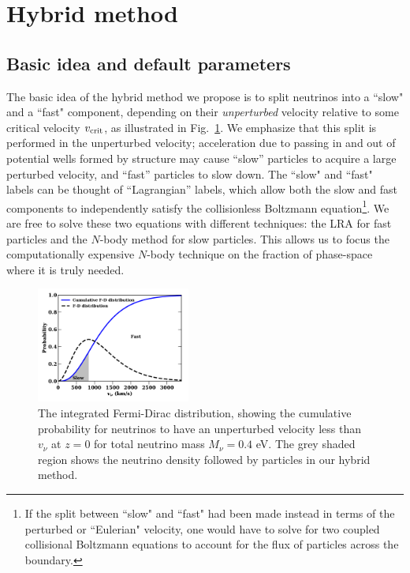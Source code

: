 \documentclass[useAMS, usenatbib]{mnras}
\begin{document}
\section{Hybrid method} \label{sec:hybrid}

\subsection{Basic idea and default parameters}

The basic idea of the hybrid method we propose is to split neutrinos into a ``slow" and a ``fast" component, depending on their \emph{unperturbed} velocity relative to some critical velocity $v_{\rm crit}$, as illustrated in Fig.~\ref{fig:fddistribution}. We emphasize that this split is performed in the unperturbed velocity; acceleration due to passing in and out of potential wells formed by structure may cause ``slow'' particles to acquire a large perturbed velocity, and ``fast'' particles to slow down. The ``slow" and ``fast" labels can be thought of ``Lagrangian'' labels, which allow both the slow and fast components to independently satisfy the collisionless Boltzmann equation\footnote{If the split between ``slow" and ``fast" had been made instead in terms of the perturbed or ``Eulerian" velocity, one would have to solve for two coupled collisional Boltzmann equations to account for the flux of particles across the boundary.}. We are free to solve these two equations with different techniques: the LRA for fast particles and the $N$-body method for slow particles. This allows us to focus the computationally expensive $N$-body technique on the fraction of phase-space where it is truly needed.

\begin{figure}
\includegraphics[width=0.45\textwidth]{nuplots/fermidirac.pdf}
  \caption{The integrated Fermi-Dirac distribution, showing the cumulative probability for neutrinos to have an unperturbed velocity less than $v_\nu$ at $z=0$ for total neutrino mass $M_\nu = 0.4$ eV.
  The grey shaded region shows the neutrino density followed by particles in our hybrid method.
  }
  \label{fig:fddistribution}
\end{figure}
\end{document}
